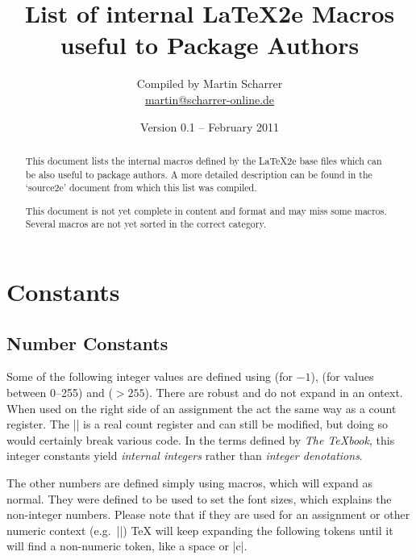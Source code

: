 \documentclass[12pt]{article}
\title{List of internal \LaTeX2e Macros useful to Package Authors}
\author{Compiled by Martin Scharrer\\\url{martin@scharrer-online.de}}
\date{Version 0.1 -- February 2011}
\begin{document}
\maketitle
\begin{abstract}
This document lists the internal macros defined by the \LaTeX2e base files which can be also useful to package authors.
A more detailed description can be found in the `source2e' document from which this list was compiled.

This document is not yet complete in content and format and may miss some macros. Several macros are not yet
sorted in the correct category.
\end{abstract}

\tableofcontents

\clearpage

\section{Constants}

\subsection{Number Constants}

Some of the following integer values are defined using \Macro\countdef\relax (for $-1$), \Macro\chardef\relax (for values between 0--255) and \Macro\mathchardef\relax ($>255$).
There are robust and do not expand in an \Macro\edef\relax context. When used on the right side of an assignment the act the 
same way as a count register.  The |\m@ne| is a real count register and can still be modified, but doing so would certainly break various code.
In the terms defined by \emph{The TeXbook}, this integer constants yield \emph{internal integers} rather than \emph{integer denotations}.

The other numbers are defined simply using macros, which will expand as normal.
They were defined to be used to set the font sizes, which explains the non-integer numbers.
Please note that if they are used for an assignment or other numeric context (e.g.\ |\ifnum|)
TeX will keep expanding the following tokens until it will find a non-numeric token, like a space or |\relax|.
\end{document}
